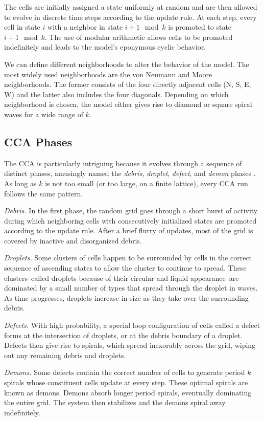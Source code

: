 \documentclass[%
 reprint,
 amsmath,amssymb,
 aps,
]{revtex4-1}
\begin{document}
The cells are initially assigned a state uniformly at random and are then allowed to evolve in discrete time steps according to the update rule. At each step, every cell in state $i$ with a neighbor in state $i+1 \mod k$ is promoted to state $i + 1 \mod k$. The use of modular arithmetic allows cells to be promoted indefinitely and leads to the model's eponymous cyclic behavior.

We can define different neighborhoods to alter the behavior of the model. The most widely used neighborhoods are the von Neumann and Moore neighborhoods. The former consists of the four directly adjacent cells (N, S, E, W) and the latter also includes the four diagonals. Depending on which neighborhood is chosen, the model either gives rise to diamond or square spiral waves for a wide range of $k$. 

\subsection{CCA Phases}
The CCA is particularly intriguing because it evolves through a sequence of distinct phases, amusingly named the \emph{debris}, \emph{droplet}, \emph{defect}, and \emph{demon} phases \cite{Fisch1991}. As long as $k$ is not too small (or too large, on a finite lattice), every CCA run follows the same pattern.

\emph{Debris.} In the first phase, the random grid goes through a short burst of activity during which neighboring cells with consecutively initialized states are promoted according to the update rule. After a brief flurry of updates, most of the grid is covered by inactive and disorganized debris. 

\emph{Droplets.} Some clusters of cells happen to be surrounded by cells in the correct sequence of ascending states to allow the cluster to continue to spread. These clusters--called droplets because of their circular and liquid appearance--are dominated by a small number of types that spread through the droplet in waves. As time progresses, droplets increase in size as they take over the surrounding debris. 

\emph{Defects.} With high probability, a special loop configuration of cells called a defect forms at the intersection of droplets, or at the debris boundary of a droplet. Defects then give rise to spirals, which spread inexorably across the grid, wiping out any remaining debris and droplets.

\emph{Demons.} Some defects contain the correct number of cells to generate period $k$ spirals whose constituent cells update at every step. These optimal spirals are known as demons. Demons absorb longer period spirals, eventually dominating the entire grid. The system then stabilizes and the demons spiral away indefinitely.
\end{document}
